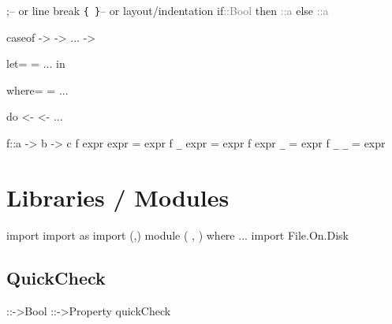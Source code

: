 \documentclass{refcard}
\begin{document}
\begin{ldesc}
	         ;\s\s\s\s-- or line break
	          \verb+{ }+\s\s-- or layout/indentation
	\li
	\li[if expression]
		if\s{}\s\textcolor{gray}{::\s{}Bool} \li
		\s\s{}then\s{} \textcolor{gray}{::\s{}a} \li
		\s\s{}else\s{} \textcolor{gray}{::\s{}a} \li

		case\s{}\s{}of     \li
		\s\s{}\s->\s{}   \li
		\s\s{}\s->\s{}   \li
		\s\s... \li
		\s\s{}\I{\_}\s->\s{}   \li

		let\s{}= \li
		\s\s\s\s{}= \li
		\s\s\s\s... \li
		in\s{} \li

		 \li
		where\s{}= \li
		\s\s\s\s\s\s{}= \li
		\s\s\s\s\s\s... \li

	\li[do notation]
		do       \li
		\s\s\s{} <-  \li
		\s\s\s{} \li
		\s\s\s{} <-  \li
		\s\s\s{}... \li

		f\s::\s{}a -> b -> c 
		f expr expr = expr \li
		f \verb+_+\s\s\s{} expr = expr \li
		f expr \verb+_+\s\s\s{} = expr \li
		f \verb+_+\s\s\s{} \verb+_+\s\s\s{} = expr
\end{ldesc}


\section{Libraries / Modules}

\begin{ldesc}
	\li[importing]              import 
	  import  as 
	     import  (,)
	\li[declaring]
		module  \li
		\s\s(  \li
		\s\s,  \li
		\s\s) \li
		where \li
	    ... \li
	 import File.On.Disk
\end{ldesc}


\subsection{QuickCheck \hfill {}}

\begin{ldesc}
		 ::\s{}\s{}->\s{}Bool \li
		 ::\s{}\s{}->\s{}Property
		quickCheck 
\end{ldesc}
\end{document}
